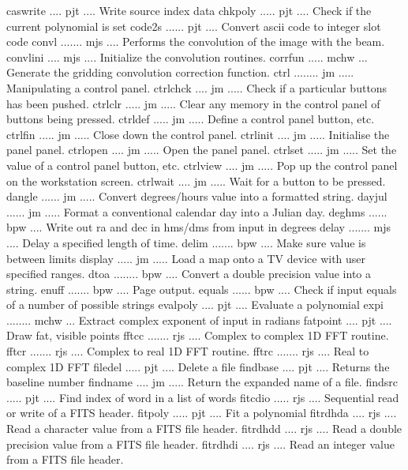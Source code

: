 {\eightpoint\begintt
caswrite .... pjt .... Write source index data 
chkpoly ..... pjt .... Check if the current polynomial is set 
code2s ...... pjt .... Convert ascii code to integer slot code 
convl ....... mjs .... Performs the convolution of the image with the beam. 
convlini .... mjs .... Initialize the convolution routines. 
\endtt}
{\eightpoint\begintt
corrfun ..... mchw ... Generate the gridding convolution correction function. 
ctrl ........ jm ..... Manipulating a control panel. 
ctrlchck .... jm ..... Check if a particular buttons has been pushed. 
ctrlclr ..... jm ..... Clear any memory in the control panel of buttons being pressed. 
ctrldef ..... jm ..... Define a control panel button, etc. 
\endtt}
{\eightpoint\begintt
ctrlfin ..... jm ..... Close down the control panel. 
ctrlinit .... jm ..... Initialise the panel panel. 
ctrlopen .... jm ..... Open the panel panel. 
ctrlset ..... jm ..... Set the value of a control panel button, etc. 
ctrlview .... jm ..... Pop up the control panel on the workstation screen. 
\endtt}
{\eightpoint\begintt
ctrlwait .... jm ..... Wait for a button to be pressed. 
dangle ...... jm ..... Convert degrees/hours value into a formatted string. 
dayjul ...... jm ..... Format a conventional calendar day into a Julian day. 
deghms ...... bpw .... Write out ra and dec in hms/dms from input in degrees 
delay ....... mjs .... Delay a specified length of time. 
\endtt}
{\eightpoint\begintt
delim ....... bpw .... Make sure value is between limits 
display ..... jm ..... Load a map onto a TV device with user specified ranges. 
dtoa ........ bpw .... Convert a double precision value into a string. 
enuff ....... bpw .... Page output. 
equals ...... bpw .... Check if input equals of a number of possible strings 
\endtt}
{\eightpoint\begintt
evalpoly .... pjt .... Evaluate a polynomial 
expi ........ mchw ... Extract complex exponent of input in radians 
fatpoint .... pjt .... Draw fat, visible points 
fftcc ....... rjs .... Complex to complex 1D FFT routine. 
fftcr ....... rjs .... Complex to real 1D FFT routine. 
\endtt}
{\eightpoint\begintt
fftrc ....... rjs .... Real to complex 1D FFT 
filedel ..... pjt .... Delete a file 
findbase .... pjt .... Returns the baseline number 
findname .... jm ..... Return the expanded name of a file. 
findsrc ..... pjt .... Find index of word in a list of words 
\endtt}
{\eightpoint\begintt
fitcdio ..... rjs .... Sequential read or write of a FITS header. 
fitpoly ..... pjt .... Fit a polynomial 
fitrdhda .... rjs .... Read a character value from a FITS file header. 
fitrdhdd .... rjs .... Read a double precision value from a FITS file header. 
fitrdhdi .... rjs .... Read an integer value from a FITS file header. 
\endtt}
